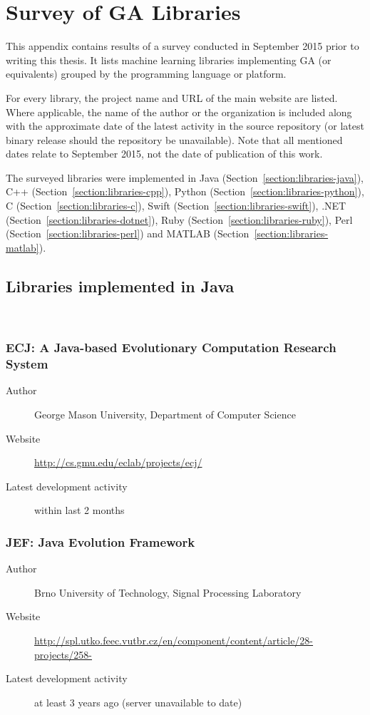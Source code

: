 \chapter{Survey of GA Libraries}\label{appendix:survey}

This appendix contains results of a survey conducted in September 2015 prior to writing this thesis. It lists machine learning libraries implementing GA (or equivalents) grouped by the programming language or platform.

For every library, the project name and URL of the main website are listed. Where applicable, the name of the author or the organization is included along with the approximate date of the latest activity in the source repository (or latest binary release should the repository be unavailable). Note that all mentioned dates relate to September 2015, not the date of publication of this work.

The surveyed libraries were implemented in Java (Section~\ref{section:libraries-java}), C++ (Section~\ref{section:libraries-cpp}), Python (Section~\ref{section:libraries-python}), C (Section~\ref{section:libraries-c}), Swift (Section~\ref{section:libraries-swift}), .NET (Section~\ref{section:libraries-dotnet}), Ruby (Section~\ref{section:libraries-ruby}), Perl (Section~\ref{section:libraries-perl}) and MATLAB (Section~\ref{section:libraries-matlab}).

\section{Libraries implemented in Java}~\label{section:libraries-java}

\subsection*{ECJ: A Java-based Evolutionary Computation Research System}
\begin{description}
    \item[Author] George Mason University, Department of Computer Science
    \item[Website] \url{http://cs.gmu.edu/eclab/projects/ecj/}
    \item[Latest development activity] within last 2 months
\end{description}


\subsection*{JEF: Java Evolution Framework}
\begin{description}
    \item[Author] Brno University of Technology, Signal Processing Laboratory
    \item[Website] \url{http://spl.utko.feec.vutbr.cz/en/component/content/article/28-projects/258-}
    \item[Latest development activity] at least 3 years ago (server unavailable to date)
\end{description}


